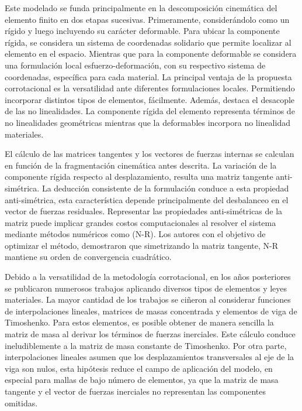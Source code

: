 Este modelado se funda principalmente en la descomposición cinemática del elemento finito en dos etapas sucesivas. Primeramente, considerándolo como un rígido y luego incluyendo su carácter deformable. Para ubicar la componente rígida, se considera un sistema de coordenadas solidario que permite localizar al elemento en el espacio. Mientras que para la componente deformable se considera una formulación local esfuerzo-deformación, con su respectivo sistema de coordenadas, específica para cada material. La principal ventaja de la propuesta corrotacional es la versatilidad ante diferentes formulaciones locales. Permitiendo incorporar distintos tipos de elementos, fácilmente. Además, destaca el desacople de las no linealidades. La componente rígida del elemento representa términos de no linealidades geométricas mientras que la deformables incorpora no linealidad materiales. 

El cálculo de las matrices tangentes y los vectores de fuerzas internas se calculan en función de la fragmentación cinemática antes descrita. La variación de la componente rígida respecto al desplazamiento, resulta una matriz tangente anti-simétrica. La deducción consistente de la formulación conduce a esta propiedad anti-simétrica, esta característica depende principalmente del desbalanceo en el vector de fuerzas residuales. Representar las propiedades anti-simétricas de la matriz puede implicar grandes costos computacionales al resolver el sistema mediante métodos numéricos como (\gls{N-R}). Los autores \cite{Nour-Omid1991} con el objetivo de optimizar el método, demostraron que simetrizando la matriz tangente, N-R mantiene su orden de convergencia cuadrático.

Debido a la versatilidad de la metodología corrotacional, en los años posteriores se publicaron numerosos trabajos aplicando diversos tipos de elementos y leyes materiales. La mayor cantidad de los trabajos se ciñeron al considerar funciones de interpolaciones lineales, matrices de masas concentrada y elementos de viga de Timoshenko. Para estos elementos, es posible obtener de manera sencilla la matriz de masa al derivar los términos de fuerzas inerciales. Este cálculo conduce ineludiblemente a la matriz de masa constante de Timoshenko. 
Por otra parte, interpolaciones lineales asumen que los desplazamientos transversales al eje de la viga son nulos, esta hipótesis reduce el campo de aplicación del modelo, en especial para mallas de bajo número de elementos, ya que la matriz de masa tangente y el vector de fuerzas inerciales no representan las componentes omitidas. 

